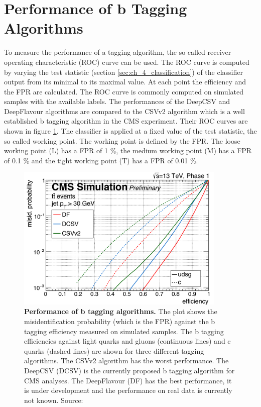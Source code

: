 \section{Performance of b Tagging Algorithms}
To measure the performance of a tagging algorithm, the so called receiver operating characteristic (ROC) curve can be used. The ROC curve is computed by varying the test statistic (section \ref{sec:ch_4_classification}) of the classifier output from its minimal to its maximal value. At each point the efficiency and the FPR are calculated. The ROC curve is commonly computed on simulated samples with the available labels. The performances of the DeepCSV and DeepFlavour algorithms are compared to the CSVv2 algorithm which is a well established b tagging algorithm in the CMS experiment. Their ROC curves are shown in figure \ref{fig:ch_5_Performance}. The classifier is applied at a fixed value of the test statistic, the so called working point. The working point is defined by the FPR. The loose working point (L) has a FPR of 1 \%, the medium working point (M) has a FPR of 0.1 \% and the tight working point (T) has a FPR of 0.01 \%. \\

\begin{figure}
\centering
\includegraphics[width=10cm]{assets/performance.png}
\caption[Architecture of the DeepFlavour Algorithm]{\textbf{Performance of b tagging algorithms.} The plot shows the misidentification probability (which is the FPR) against the b tagging efficiency measured on simulated samples. The b tagging efficiencies against light quarks and gluons (continuous lines) and c quarks (dashed lines) are shown for three different tagging algorithms. The CSVv2 algorithm has the worst performance. The DeepCSV (DCSV) is the currently proposed b tagging algorithm for CMS analyses. The DeepFlavour (DF) has the best performance, it is under development and the performance on real data is currently not known. Source: \cite{DeepFlavour}}
\label{fig:ch_5_Performance}
\end{figure}

